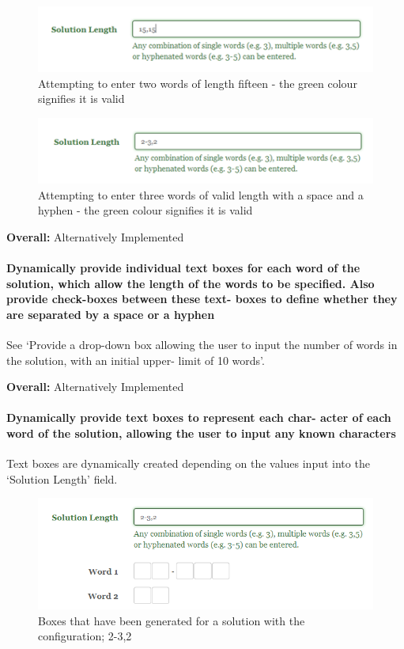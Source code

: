 \begin{figure}[H]
	\centering
	\includegraphics[keepaspectratio=true]{evidence/dropdown2.png}
	\caption{Attempting to enter two words of length fifteen - the green colour signifies it is valid}
\end{figure}

\begin{figure}[H]
	\centering
	\includegraphics[keepaspectratio=true]{evidence/dropdown3.png}
	\caption{Attempting to enter three words of valid length with a space and a hyphen - the green 
colour signifies it is valid}
\end{figure}

{\bf Overall:} Alternatively Implemented

\paragraph{Dynamically provide individual text boxes for each word
of the solution, which allow the length of the words to be
specified. Also provide check-boxes between these text-
boxes to define whether they are separated by a space
or a hyphen}

See `Provide a drop-down box allowing the user to input the
number of words in the solution, with an initial upper-
limit of 10 words'.

{\bf Overall:} Alternatively Implemented

\paragraph{Dynamically provide text boxes to represent each char-
acter of each word of the solution, allowing the user to
input any known characters}

Text boxes are dynamically created depending on the values input into 
the `Solution Length' field. 

\begin{figure}[H]
	\centering
	\includegraphics[keepaspectratio=true,scale=0.9]{evidence/dynamicboxes.png}
	\caption{Boxes that have been generated for a solution with the configuration; 2-3,2}
\end{figure}

